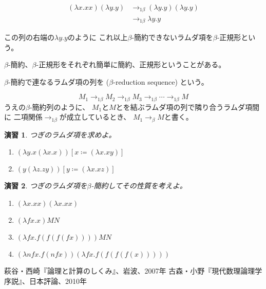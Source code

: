 \documentclass[fleqn]{jsarticle}
\newtheorem{exer}{演習}
\begin{document}
\begin{align*}
  (\lambda x.xx)(\lambda y.y) &\to_{1 \beta} (\lambda y.y)(\lambda y.y)\\
                            &\to_{1 \beta} \lambda y.y
\end{align*}

この列の右端の$\lambda y.y$のように
これ以上$\beta$-簡約できないラムダ項を$\beta$-正規形という。

$\beta$-簡約、$\beta$-正規形をそれぞれ簡単に簡約、正規形ということがある。

$\beta$-簡約で連なるラムダ項の列を
 ($\beta$-reduction sequence) という。

\[M_1 \to_{1 \beta} M_2 \to_{1 \beta} M_3 \to_{1 \beta} \cdots \to_{1 \beta} M \]
うえの$\beta$-簡約列のように、
$M_1$と$M$とを結ぶラムダ項の列で隣り合うラムダ項間に
二項関係$\to_{1 \beta}$が成立しているとき、
$M_1 \to_{\beta} M$と書く。



\begin{exer}
つぎのラムダ項を求めよ。

\begin{enumerate}
  \item $( \lambda y.x (\lambda x.x ))[x \coloneqq ( \lambda x.xy)]$
  \item $(y ( \lambda z.zy))[y \coloneqq ( \lambda x.xz)]$
\end{enumerate}
\end{exer}

\begin{exer}
つぎのラムダ項を$\beta$-簡約してその性質を考えよ。

\begin{enumerate}
  \item $( \lambda x.xx)( \lambda x.xx)$
  \item $( \lambda fx.x)MN$
  \item $( \lambda fx.f(f(f(fx))))MN$
  \item $( \lambda nfx. f(nfx))( \lambda fx.f(f(f(f(x)))))$
\end{enumerate}

\end{exer}

\begin{thebibliography}{99}
   萩谷・西崎『論理と計算のしくみ』、岩波、2007年
   古森・小野『現代数理論理学序説』、日本評論、2010年
  \bibitem{} 
\end{thebibliography}
\end{document}
